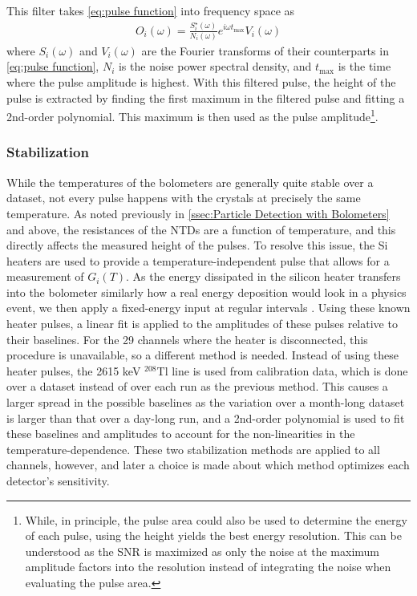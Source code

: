 This filter takes \autoref{eq:pulse function} into frequency space as
\begin{align}
    O_i(\omega)=\frac{S_i^\star(\omega)}{N_i(\omega)}e^{i\omega t_{\textrm{max}}}V_i(\omega)
\end{align}
where $S_i(\omega)$ and $V_i(\omega)$ are the Fourier transforms of their counterparts in \autoref{eq:pulse function}, $N_i$ is the noise power spectral density, and $t_\textrm{max}$ is the time where the pulse amplitude is highest.
With this filtered pulse, the height of the pulse is extracted by finding the first maximum in the filtered pulse and fitting a 2nd-order polynomial.
This maximum is then used as the pulse amplitude\footnote{While, in principle, the pulse area could also be used to determine the energy of each pulse, using the height yields the best energy resolution.
This can be understood as the SNR is maximized as only the noise at the maximum amplitude factors into the resolution instead of integrating the noise when evaluating the pulse area.}.

\subsubsection*{Stabilization}
\label{ssec:Stabilization}

While the temperatures of the bolometers are generally quite stable over a dataset, not every pulse happens with the crystals at precisely the same temperature.
As noted previously in \autoref{ssec:Particle Detection with Bolometers} and above, the resistances of the NTDs are a function of temperature, and this directly affects the measured height of the pulses.
To resolve this issue, the Si heaters are used to provide a temperature-independent pulse that allows for a measurement of $G_i(T)$.
As the energy dissipated in the silicon heater transfers into the bolometer similarly how a real energy deposition would look in a physics event, we then apply a fixed-energy input at regular intervals \cite{ALESSANDRELLO1998454:Si-heater}.
Using these known heater pulses, a linear fit is applied to the amplitudes of these pulses relative to their baselines.
For the 29 channels where the heater is disconnected, this procedure is unavailable, so a different method is needed.
Instead of using these heater pulses, the 2615 keV $^{208}$Tl line is used from calibration data, which is done over a dataset instead of over each run as the previous method.
This causes a larger spread in the possible baselines as the variation over a month-long dataset is larger than that over a day-long run, and a 2nd-order polynomial is used to fit these baselines and amplitudes to account for the non-linearities in the temperature-dependence.
These two stabilization methods are applied to all channels, however, and later a choice is made about which method optimizes each detector's sensitivity.

